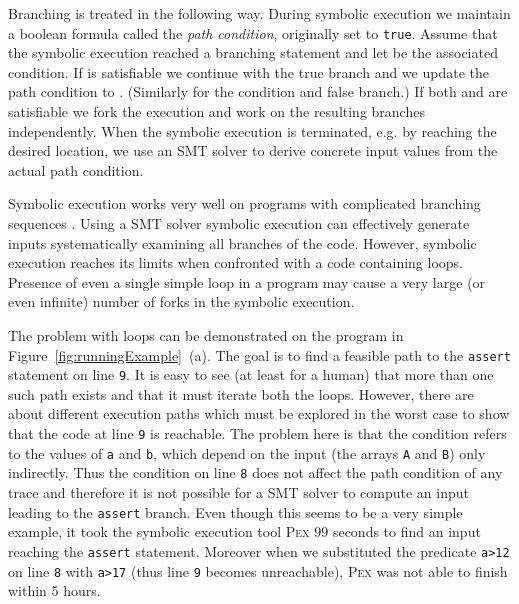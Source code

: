 \documentclass{llncs}
\newcommand{\Pex}{\textsc{Pex}\xspace}
\begin{document}
Branching is treated in the following way. During symbolic execution we
maintain a boolean formula  called the \emph{path condition},
originally set to \texttt{true}. Assume that the symbolic execution reached a
branching statement and let  be the associated condition. If
 is satisfiable we continue with the true branch and we
update the path condition to . (Similarly for the condition
 and false branch.) If both  and
 are satisfiable we fork the execution and work on the
resulting branches independently. When the symbolic execution is terminated,
e.g. by reaching the desired location, we use an SMT solver to derive concrete
input values from the actual path condition.

Symbolic execution works very well on programs with complicated branching
sequences \cite{Cadar08,TdH08,Pex}. Using a SMT solver symbolic execution can
effectively generate inputs systematically examining all branches of the
code. However, symbolic execution reaches its limits when confronted with a
code containing loops. Presence of even a single simple loop in a program
may cause a very large (or even infinite) number of forks in the symbolic
execution.

The problem with loops can be demonstrated on the program in
Figure~\ref{fig:runningExample}~(a). The goal is to find a feasible path to
the \texttt{assert} statement on line \texttt{9}. It is easy to see (at
least for a human) that more than one such path exists and that it must
iterate both the loops. However, there are about  different execution
paths which must be explored in the worst case to show that  the code at line
\texttt{9} is reachable. The problem here is that the condition refers
 to the values of \texttt{a} and \texttt{b}, which depend on the input (the
 arrays \texttt{A} and \texttt{B}) only indirectly. Thus the condition on
 line \texttt{8} does not affect the path condition of any trace and
 therefore it is not possible for a SMT solver to compute an input leading to
 the \texttt{assert} branch. Even though this seems to be a very simple example,
it took the symbolic execution tool \Pex 99 seconds to find an
input reaching the \texttt{assert} statement. Moreover when we substituted the
predicate \texttt{a>12} on line \texttt{8} with \texttt{a>17} (thus line
\texttt{9} becomes unreachable), \Pex
was not able to finish within 5 hours.
\end{document}
